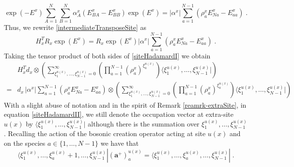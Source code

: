 \documentclass[10pt]{article}
\numberwithin{equation}{section}
\numberwithin{equation}{subsection}
\newcommand{\dt}{\;.}
\begin{document}
\begin{equation}\label{HadTransfBoundary}
\exp{(-E^{x})}\sum_{A=1}^{N}\sum_{B=1}^{N}\alpha_{A}^{x}\left(E_{B A}^{x}-E_{BB}^{x}\right)\exp{(E^{x})}=	|\alpha^{x}|\sum_{a=1}^{N-1}\left(\rho_{a}^{x}E_{Na}^{x}-E_{aa}^{x}\right)\dt
\end{equation}
Thus, we rewrite \eqref{intermediateTransposeSite} as
\begin{equation}\label{siteHadamardI}
H_{x}^{T}R_{x}\exp{(E^{x})}=R_{x}\exp{(E^{x})}|\alpha^{x}|\sum_{a=1}^{N-1}\left(\rho_{a}^{x}E_{Na}^{x}-E_{aa}^{x}\right)\dt
\end{equation}
Taking the tensor product of both sides of \eqref{siteHadamardI}%
we obtain 
\begin{equation}\label{siteHadamardII}
    \begin{split}
    	&H_{x}^{T}d_{x}\otimes\left(\sum_{\xi_{1}^{u(x)},\ldots,\xi_{N-1}^{u(x)}=0}^{\infty}\left(\prod_{a=1}^{N-1}\left(\rho_{a}^{x}\right)^{\xi_{a}^{u(x)}}\right)\langle \xi_{1}^{u(x)},\ldots,\xi_{N-1}^{u(x)}|\right)\\=&
 d_{x}\,
|\alpha^{x}|\sum_{a=1}^{N-1}\left(\rho_{a}^{x}E_{Na}^{x}-E_{aa}^{x}\right)\otimes \left(\sum_{\xi_{1}^{u(x)},\ldots,\xi_{N-1}^{u(x)}=0}^{\infty}\left(\prod_{a=1}^{N-1}\left(\rho_{a}^{x}\right)^{\xi_{a}^{u(x)}}\right)\langle \xi_{1}^{u(x)},\ldots,\xi_{N-1}^{u(x)}|\right)
    \end{split}
\end{equation}
{\color{blue}With a slight abuse of notation and in the spirit of Remark \ref{reamrk-extraSite}, in equation \eqref{siteHadamardII}, we still denote the occupation vector at extra-site $u(x)$ by $\langle \xi_{1}^{u(x)},\ldots,\xi_{N-1}^{u(x)}|$ although there is the summation over $\xi_{1}^{u(x)},\ldots,\xi_{N-1}^{u(x)}$.}
Recalling the action of the bosonic creation operator acting at site $u(x)$ and on the species $a\in \{1,\ldots,N-1\}$ we have that 
\begin{equation}\label{bosonicKX}
    \langle \xi_{1}^{u(x)},\ldots,\xi_{a}^{u(x)}+1,\ldots,\xi_{N-1}^{u(x)}|(\mathbf{a}^{+})^{u(x)}_{a}=  \langle \xi_{1}^{u(x)},\ldots,\xi_{a}^{u(x)},\ldots,\xi_{N-1}^{u(x)}|\dt
\end{equation}
\end{document}
